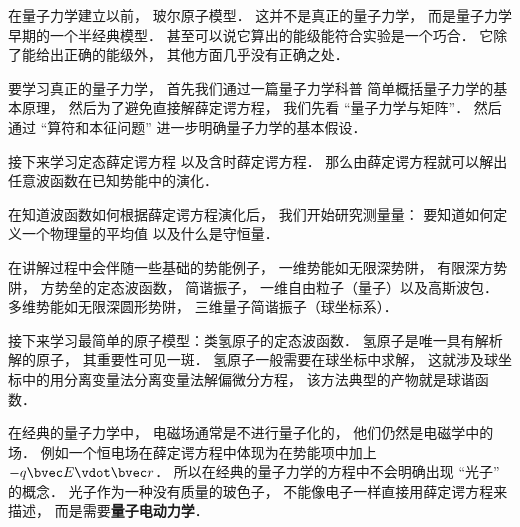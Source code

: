 在量子力学建立以前， 玻尔原子模型． 这并不是真正的量子力学， 而是量子力学早期的一个半经典模型． 甚至可以说它算出的能级能符合实验是一个巧合． 它除了能给出正确的能级外， 其他方面几乎没有正确之处．

要学习真正的量子力学， 首先我们通过一篇量子力学科普 简单概括量子力学的基本原理， 然后为了避免直接解薛定谔方程， 我们先看 “量子力学与矩阵”． 然后通过 “算符和本征问题” 进一步明确量子力学的基本假设．

接下来学习定态薛定谔方程 以及含时薛定谔方程． 那么由薛定谔方程就可以解出任意波函数在已知势能中的演化．

在知道波函数如何根据薛定谔方程演化后， 我们开始研究测量量： 要知道如何定义一个物理量的平均值 以及什么是守恒量．

在讲解过程中会伴随一些基础的势能例子， 一维势能如无限深势阱， 有限深方势阱， 方势垒的定态波函数， 简谐振子， 一维自由粒子（量子）以及高斯波包． 多维势能如无限深圆形势阱， 三维量子简谐振子（球坐标系）．

接下来学习最简单的原子模型：类氢原子的定态波函数． 氢原子是唯一具有解析解的原子， 其重要性可见一斑． 氢原子一般需要在球坐标中求解， 这就涉及球坐标中的用分离变量法分离变量法解偏微分方程， 该方法典型的产物就是球谐函数．

在经典的量子力学中， 电磁场通常是不进行量子化的， 他们仍然是电磁学中的场． 例如一个恒电场在薛定谔方程中体现为在势能项中加上 $-q\bvec E \vdot \bvec r$． 所以在经典的量子力学的方程中不会明确出现 “光子” 的概念． 光子作为一种没有质量的玻色子， 不能像电子一样直接用薛定谔方程来描述， 而是需要\textbf{量子电动力学}．
